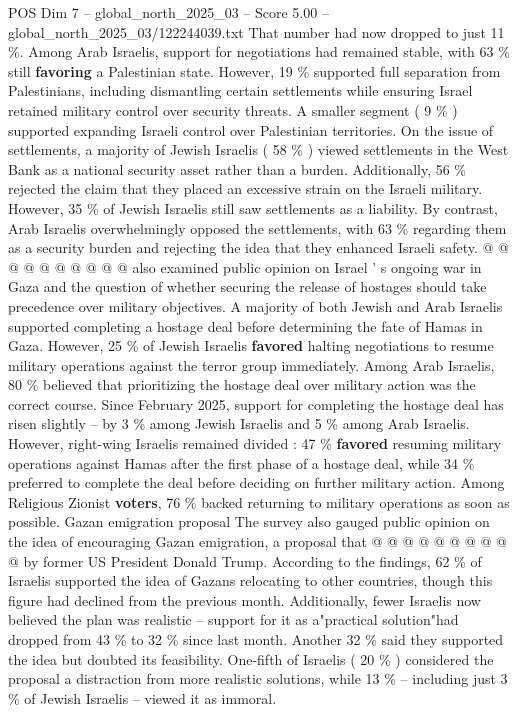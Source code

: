 \begin{textsample}{POS Dim 7 – global\_north\_2025\_03 – Score 5.00 – global\_north\_2025\_03/122244039.txt}
That number had now dropped to just 11 \%.
Among Arab Israelis, support for negotiations had remained stable, with 63 \% still \textbf{favoring} a Palestinian state.
However, 19 \% supported full separation from Palestinians, including dismantling certain settlements while ensuring Israel retained military control over security threats.
A smaller segment ( 9 \% ) supported expanding Israeli control over Palestinian territories.
On the issue of settlements, a majority of Jewish Israelis ( 58 \% ) viewed settlements in the West Bank as a national security asset rather than a burden.
Additionally, 56 \% rejected the claim that they placed an excessive strain on the Israeli military.
However, 35 \% of Jewish Israelis still saw settlements as a liability.
By contrast, Arab Israelis overwhelmingly opposed the settlements, with 63 \% regarding them as a security burden and rejecting the idea that they enhanced Israeli safety. @ @ @ @ @ @ @ @ @ @ also examined public opinion on Israel ' s ongoing war in Gaza and the question of whether securing the release of hostages should take precedence over military objectives.
A majority of both Jewish and Arab Israelis supported completing a hostage deal before determining the fate of Hamas in Gaza.
However, 25 \% of Jewish Israelis \textbf{favored} halting negotiations to resume military operations against the terror group immediately.
Among Arab Israelis, 80 \% believed that prioritizing the hostage deal over military action was the correct course.
Since February 2025, support for completing the hostage deal has risen slightly -- by 3 \% among Jewish Israelis and 5 \% among Arab Israelis.
However, right-wing Israelis remained divided : 47 \% \textbf{favored} resuming military operations against Hamas after the first phase of a hostage deal, while 34 \% preferred to complete the deal before deciding on further military action.
Among Religious Zionist \textbf{voters}, 76 \% backed returning to military operations as soon as possible.
Gazan emigration proposal The survey also gauged public opinion on the idea of encouraging Gazan emigration, a proposal that @ @ @ @ @ @ @ @ @ @ by former US President Donald Trump.
According to the findings, 62 \% of Israelis supported the idea of Gazans relocating to other countries, though this figure had declined from the previous month.
Additionally, fewer Israelis now believed the plan was realistic -- support for it as a"practical solution"had dropped from 43 \% to 32 \% since last month.
Another 32 \% said they supported the idea but doubted its feasibility.
One-fifth of Israelis ( 20 \% ) considered the proposal a distraction from more realistic solutions, while 13 \% -- including just 3 \% of Jewish Israelis -- viewed it as immoral.

\end{textsample}
